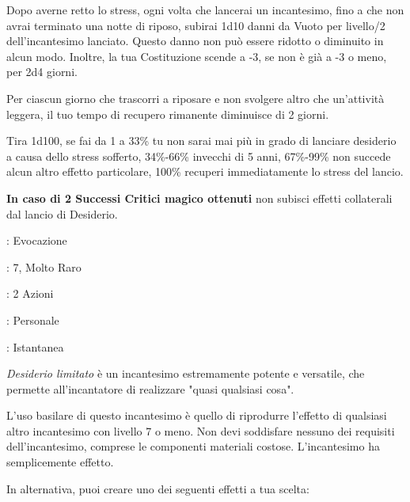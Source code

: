 \begin{multicols}{2}
Dopo averne retto lo stress, ogni volta che lancerai un incantesimo, fino a che non avrai terminato una notte di riposo, subirai 1d10 danni da Vuoto per livello/2 dell'incantesimo lanciato. Questo danno non può essere ridotto o diminuito in alcun modo. Inoltre, la tua Costituzione scende a -3, se non è già a -3 o meno, per 2d4 giorni.

Per ciascun giorno che trascorri a riposare e non svolgere altro che un'attività leggera, il tuo tempo di recupero rimanente diminuisce di 2 giorni.

Tira 1d100, se fai da 1 a 33\% tu non sarai mai più in grado di lanciare desiderio a causa dello stress sofferto, 34\%-66\% invecchi di 5 anni, 67\%-99\% non succede alcun altro effetto particolare, 100\% recuperi immediatamente lo stress del lancio.

\textbf{In caso di 2 Successi Critici magico ottenuti} non subisci effetti collaterali dal lancio di Desiderio.


\noindent\colorbox{OBSSgold!10}{
\begin{minipage}{0.95\linewidth}
\begin{description}[noitemsep, topsep=0pt, parsep=0pt, partopsep=0pt, leftmargin=0cm, labelwidth=1.3cm]
	\item[\textbf{Lista}]: Evocazione
	\item[\textbf{Livello}]: 7, Molto Raro
	\item[\textbf{Lancio}]: 2 Azioni
	\item[\textbf{Gittata}]: Personale
	\item[\textbf{Durata}]: Istantanea
\end{description}
\end{minipage}}\smallskip

\emph{Desiderio limitato} è un incantesimo estremamente potente e versatile, che permette all'incantatore di realizzare "quasi qualsiasi cosa".

L'uso basilare di questo incantesimo è quello di riprodurre l'effetto di qualsiasi altro incantesimo con livello 7 o meno. Non devi soddisfare nessuno dei requisiti dell'incantesimo, comprese le componenti materiali costose. L'incantesimo ha semplicemente effetto.

In alternativa, puoi creare uno dei seguenti effetti a tua scelta:


\end{multicols}
